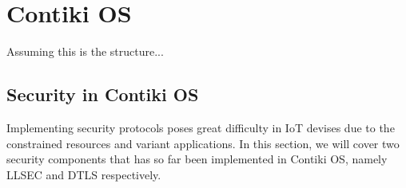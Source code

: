 \chapter{Contiki OS}
Assuming this is the structure...

\section{Security in Contiki OS}

%
%
%
%
%

Implementing security protocols poses great difficulty in IoT devises due to the constrained resources and variant applications. In this section, we will cover two security components that has so far been implemented in Contiki OS, namely LLSEC and DTLS respectively.

